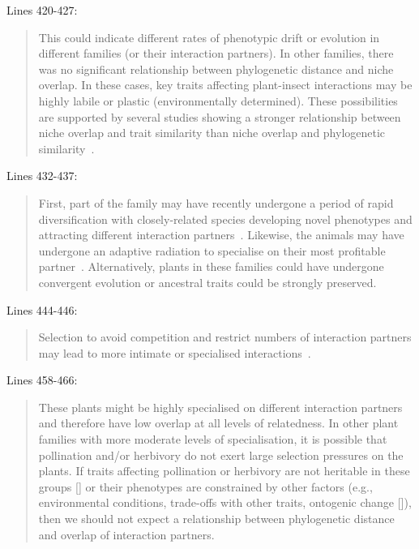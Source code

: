 \documentclass[12pt]{letter}
\begin{document}
		Lines 420-427:

		\begin{quotation}

			This could indicate different 
			rates of phenotypic drift or evolution in different families (or their interaction partners). 
			In other families, there was no significant relationship between phylogenetic
			distance and niche overlap. In these cases, key traits affecting 
			plant-insect interactions may be highly labile or plastic (environmentally determined). These possibilities are supported by several studies showing a stronger relationship between niche overlap and trait similarity than niche overlap and phylogenetic similarity~\citep{Junker2015,Ibanez2016,Endara2017}. 

		\end{quotation}


		Lines 432-437:

		\begin{quotation}

			First, part of the family may have recently 
			undergone a period of rapid diversification with closely-related species 
			developing novel phenotypes and attracting different  
			interaction partners~\citep{Linder2008,Breitkopf2015}. Likewise, the
			animals may have undergone an adaptive radiation to 
			specialise on their most profitable partner~\citep{Janz2006}. 
			Alternatively, plants in these families could have undergone convergent evolution or ancestral traits could be strongly preserved.

		\end{quotation}


		Lines 444-446:

		\begin{quotation}

			Selection to avoid 
			competition and restrict numbers of interaction partners may lead to
			more intimate or specialised interactions~\citep{Ponisio2017}.

		\end{quotation}


		Lines 458-466:

		\begin{quotation}

			These plants might 
			be highly specialised on different interaction partners and therefore
			have low overlap at all levels of relatedness. In other plant families
			with more moderate levels of specialisation, it is possible 
			that pollination and/or herbivory do not exert large
			selection pressures on the plants. If traits affecting pollination
			or herbivory are not heritable in these groups [\citealp{Kursar2009}] 
			or their phenotypes are constrained by other factors (e.g., 
			environmental conditions, trade-offs with other traits, ontogenic
			change [\citealp{Karinho2014}]), then we should not expect a relationship 
			between phylogenetic distance and overlap of interaction partners.

		\end{quotation}
\end{document}
